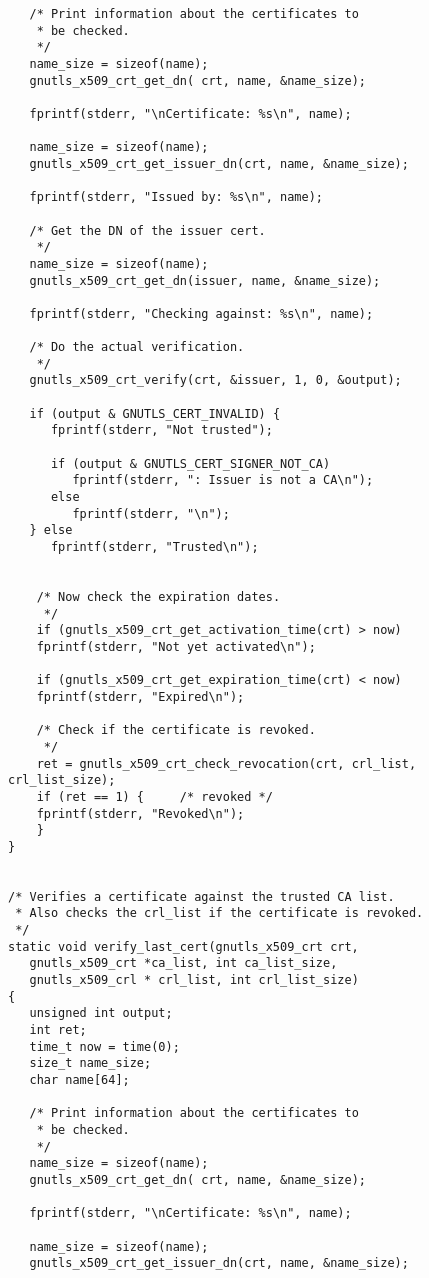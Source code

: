 \begin{verbatim}
   /* Print information about the certificates to
    * be checked.
    */
   name_size = sizeof(name);
   gnutls_x509_crt_get_dn( crt, name, &name_size);

   fprintf(stderr, "\nCertificate: %s\n", name);

   name_size = sizeof(name);
   gnutls_x509_crt_get_issuer_dn(crt, name, &name_size);

   fprintf(stderr, "Issued by: %s\n", name);

   /* Get the DN of the issuer cert.
    */
   name_size = sizeof(name);
   gnutls_x509_crt_get_dn(issuer, name, &name_size);

   fprintf(stderr, "Checking against: %s\n", name);

   /* Do the actual verification.
    */
   gnutls_x509_crt_verify(crt, &issuer, 1, 0, &output);

   if (output & GNUTLS_CERT_INVALID) {
      fprintf(stderr, "Not trusted");

      if (output & GNUTLS_CERT_SIGNER_NOT_CA)
         fprintf(stderr, ": Issuer is not a CA\n");
      else
         fprintf(stderr, "\n");
   } else
      fprintf(stderr, "Trusted\n");


    /* Now check the expiration dates.
     */
    if (gnutls_x509_crt_get_activation_time(crt) > now)
	fprintf(stderr, "Not yet activated\n");

    if (gnutls_x509_crt_get_expiration_time(crt) < now)
	fprintf(stderr, "Expired\n");

    /* Check if the certificate is revoked.
     */
    ret = gnutls_x509_crt_check_revocation(crt, crl_list, crl_list_size);
    if (ret == 1) {		/* revoked */
	fprintf(stderr, "Revoked\n");
    }
}


/* Verifies a certificate against the trusted CA list.
 * Also checks the crl_list if the certificate is revoked.
 */
static void verify_last_cert(gnutls_x509_crt crt,
   gnutls_x509_crt *ca_list, int ca_list_size,
   gnutls_x509_crl * crl_list, int crl_list_size)
{ 
   unsigned int output;
   int ret;
   time_t now = time(0);
   size_t name_size;
   char name[64];

   /* Print information about the certificates to
    * be checked.
    */
   name_size = sizeof(name);
   gnutls_x509_crt_get_dn( crt, name, &name_size);

   fprintf(stderr, "\nCertificate: %s\n", name);

   name_size = sizeof(name);
   gnutls_x509_crt_get_issuer_dn(crt, name, &name_size);


\end{verbatim}
